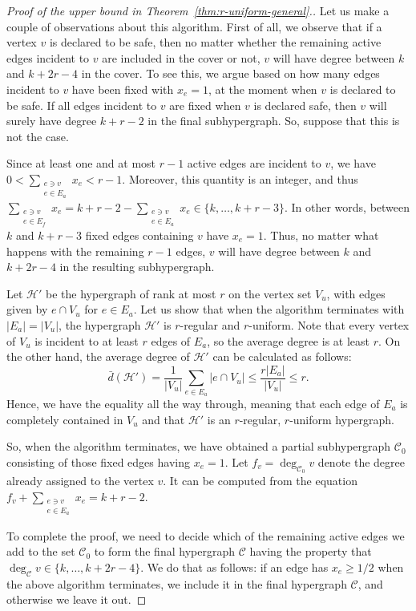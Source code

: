 \documentclass[11pt, a4paper]{article}
\numberwithin{theorem}{section} %
\theoremstyle{remark}
\theoremstyle{definition}
\def\cC{\mathcal{C}}
\def\cH{\mathcal{H}}
\begin{document}
\begin{proof}[Proof of the upper bound in Theorem~\ref{thm:r-uniform-general}.]
Let us make a couple of observations about this algorithm. First of all, we observe that if a vertex $v$ is declared to be safe, then no matter whether the remaining active edges incident to $v$ are included in the cover or not, $v$ will have degree between $k$ and $k+2r-4$ in the cover. To see this, we argue based on how many edges incident to $v$ have been fixed with $x_e=1$, at the moment when $v$ is declared to be safe. If all edges incident to $v$ are fixed when $v$ is declared safe, then $v$ will surely have degree $k+r-2$ in the final subhypergraph. So, suppose that this is not the case.

Since at least one and at most $r-1$ active edges are incident to $v$, we have $0<\sum_{\substack{e\ni v\\e\in E_a}} x_e<r-1$. Moreover, this quantity is an integer, and thus $\sum_{\substack{e\ni v\\e\in E_f}}x_e=k+r-2-\sum_{\substack{e\ni v\\e\in E_a}} x_e\in \{k, \dots, k+r-3\}$. In other words, between $k$ and $k+r-3$ fixed edges containing $v$ have $x_e=1$. Thus, no matter what happens with the remaining $r-1$ edges, $v$ will have degree between $k$ and $k+2r-4$ in the resulting subhypergraph.

Let $\cH'$ be the hypergraph of rank at most $r$ on the vertex set $V_u$, with edges given by $e\cap V_u$ for $e\in E_a$. Let us show that when the algorithm terminates with $|E_a|=|V_u|$, the hypergraph $\cH'$ is $r$-regular and $r$-uniform. Note that every vertex of $V_u$ is incident to at least $r$ edges of $E_a$, so the average degree is at least $r$. On the other hand, the average degree of $\cH'$ can be calculated as follows:
\[\bar{d}(\cH')=\frac{1}{|V_u|}\sum_{e\in E_a}|e\cap V_u|\leq \frac{r|E_a|}{|V_u|}\leq r.\]
Hence, we have the equality all the way through, meaning that each edge of $E_a$ is completely contained in $V_u$ and that $\cH'$ is an $r$-regular, $r$-uniform hypergraph.

So, when the algorithm terminates, we have obtained a partial subhypergraph $\cC_0$ consisting of those fixed edges having $x_e=1$. Let $f_v=\deg_{\cC_0} v$ denote the degree already assigned to the vertex $v$. It can be computed from the equation $f_v+\sum_{\substack{e\ni v\\e\in E_a}}x_e=k+r-2$. 

To complete the proof, we need to decide which of the remaining active edges we add to the set $\cC_0$ to form the final hypergraph $\cC$ having the property that $\deg_{\cC}v\in \{k, \dots, k+2r-4\}$. We do that as follows: if an edge has $x_e\geq 1/2$ when the above algorithm terminates, we include it in the final hypergraph $\cC$, and otherwise we leave it out.


\end{proof}
\end{document}
